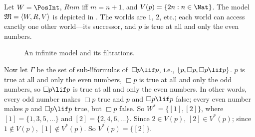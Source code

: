 \documentclass[../../../include/open-logic-section]{subfiles}
\begin{document}
\begin{ex}
  Let $W = \PosInt$, $Rnm$ iff $m = n + 1$, and $V(p) = \Setabs{2n}{n \in
    \Nat}$. The model $\mModel{M} = \tuple{W, R, V}$ is depicted in
  . The worlds are $1$, $2$, etc.; each
  world can access exactly one other world---its successor, and $p$ is
  true at all and only the even numbers.

  \begin{figure}
    \centering

    \caption{An infinite model and its filtrations.}
  \end{figure}
  
  Now let $\Gamma$ be the set of sub-!!{formula}s of~$\Box p \lif p$,
  i.e., $\{p, \Box p, \Box p \lif p\}$. $p$ is true at all and only
  the even numbers, $\Box p$ is true at all and only the odd numbers,
  so $\Box p \lif p$ is true at all and only the even numbers. In
  other words, every odd number makes $\Box p$ true and $p$ and $\Box
  p \lif p$ false; every even number makes $p$ and $\Box p \lif p$
  true, but $\Box p$ false. So $W^* = \{ [1], [2] \}$, where $[1] =
  \{1, 3, 5, \dots\}$ and $[2] = \{2, 4, 6, \dots\}$. Since $2 \in
  V(p)$, $[2] \in V^*(p)$; since $1 \notin V(p)$, $[1] \notin
  V^*(p)$. So $V^*(p) = \{[2]\}$.


\end{ex}
\end{document}
